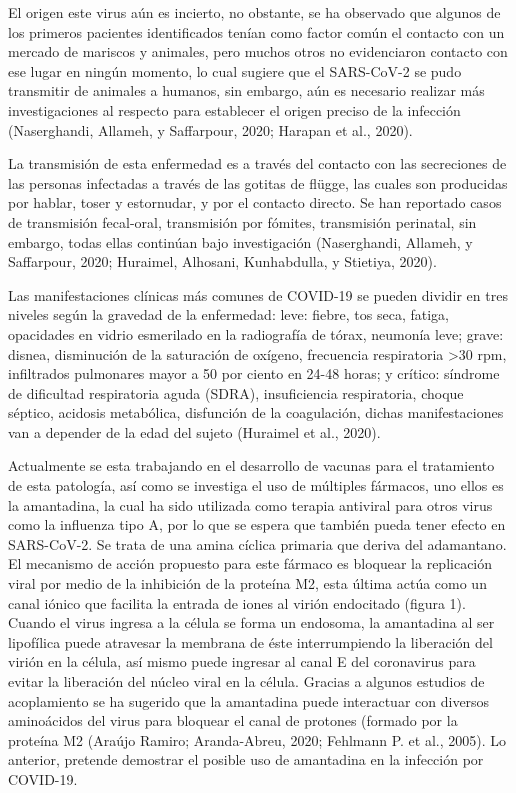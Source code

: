 \documentclass[12pt]{article}
\begin{document}
	El origen este virus aún es incierto, no obstante, se ha observado que algunos de los primeros pacientes identificados tenían como factor común el contacto con un mercado de mariscos y animales, pero muchos otros no evidenciaron contacto con ese lugar en ningún momento, lo cual sugiere que el SARS-CoV-2 se pudo transmitir de animales a humanos, sin embargo, aún es necesario realizar más investigaciones al respecto para establecer el origen preciso de la infección (Naserghandi, Allameh, y Saffarpour, 2020; Harapan et al., 2020).
	
	La transmisión de esta enfermedad es a través del contacto con las secreciones de las personas infectadas a través de las gotitas de flügge, las cuales son producidas por hablar, toser y estornudar, y por el contacto directo. Se han reportado casos de transmisión fecal-oral, transmisión por fómites, transmisión perinatal, sin embargo, todas ellas continúan bajo investigación (Naserghandi, Allameh, y Saffarpour, 2020; Huraimel, Alhosani, Kunhabdulla, y Stietiya, 2020).
	
	Las manifestaciones clínicas más comunes de COVID-19 se pueden dividir en tres niveles según la gravedad de la enfermedad: leve: fiebre, tos seca, fatiga, opacidades en vidrio esmerilado en la radiografía de tórax, neumonía leve; grave: disnea, disminución de la saturación de oxígeno, frecuencia respiratoria >30 rpm, infiltrados pulmonares mayor a 50 por ciento en 24-48 horas; y crítico: síndrome de dificultad respiratoria aguda (SDRA), insuficiencia respiratoria, choque séptico, acidosis metabólica, disfunción de la coagulación, dichas manifestaciones van a depender de la edad del sujeto (Huraimel et al., 2020). 
	
	Actualmente se esta trabajando en el desarrollo de vacunas para el tratamiento de esta patología, así como se investiga el uso de múltiples fármacos, uno ellos es la amantadina, la cual ha sido utilizada como terapia antiviral para otros virus como la influenza tipo A, por lo que se espera que también pueda tener efecto en SARS-CoV-2. Se trata de una amina cíclica primaria que deriva del adamantano. El mecanismo de acción propuesto para este fármaco es bloquear la replicación viral por medio de la inhibición de la proteína M2, esta última actúa como un canal iónico que facilita la entrada de iones al virión endocitado (figura 1). Cuando el virus ingresa a la célula se forma un endosoma, la amantadina al ser lipofílica puede atravesar la membrana de éste interrumpiendo la liberación del virión en la célula, así mismo puede ingresar al canal E del coronavirus para evitar la liberación del núcleo viral en la célula. Gracias a algunos estudios de acoplamiento se ha sugerido que la amantadina puede interactuar con diversos aminoácidos del virus para bloquear el canal de protones (formado por la proteína M2 (Araújo Ramiro; Aranda-Abreu, 2020; Fehlmann P. et al., 2005). Lo anterior, pretende demostrar el posible uso de amantadina en la infección por COVID-19.
	
\end{document}
